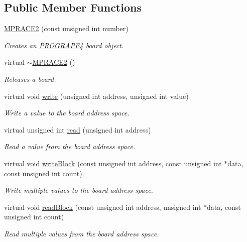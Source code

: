 \subsection*{Public Member Functions}
\begin{CompactItemize}
\item 
\hyperlink{classmprace_1_1PROGRAPE4_a0}{MPRACE2} (const unsigned int number)
\begin{CompactList}\small\item\em Creates an \hyperlink{classmprace_1_1PROGRAPE4}{PROGRAPE4} board object. \item\end{CompactList}\item 
virtual \hyperlink{classmprace_1_1PROGRAPE4_a1}{$\sim$MPRACE2} ()
\begin{CompactList}\small\item\em Releases a board. \item\end{CompactList}\item 
virtual void \hyperlink{classmprace_1_1PROGRAPE4_a2}{write} (unsigned int address, unsigned int value)
\begin{CompactList}\small\item\em Write a value to the board address space. \item\end{CompactList}\item 
virtual unsigned int \hyperlink{classmprace_1_1PROGRAPE4_a3}{read} (unsigned int address)
\begin{CompactList}\small\item\em Read a value from the board address space. \item\end{CompactList}\item 
virtual void \hyperlink{classmprace_1_1PROGRAPE4_a4}{write\-Block} (const unsigned int address, const unsigned int $\ast$data, const unsigned int count)
\begin{CompactList}\small\item\em Write multiple values to the board address space. \item\end{CompactList}\item 
virtual void \hyperlink{classmprace_1_1PROGRAPE4_a5}{read\-Block} (const unsigned int address, unsigned int $\ast$data, const unsigned int count)
\begin{CompactList}\small\item\em Read multiple values from the board address space. \item\end{CompactList}\item 

\end{CompactItemize}
